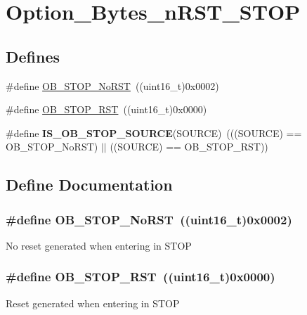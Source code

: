 \hypertarget{group__Option__Bytes__nRST__STOP}{
\section{Option\_\-Bytes\_\-nRST\_\-STOP}
\label{group__Option__Bytes__nRST__STOP}
}
\subsection*{Defines}
\begin{DoxyCompactItemize}
\item 
\#define \hyperlink{group__Option__Bytes__nRST__STOP_ga6762d6e4045fec58b49dfc03c1927d51}{OB\_\-STOP\_\-NoRST}~((uint16\_\-t)0x0002)
\item 
\#define \hyperlink{group__Option__Bytes__nRST__STOP_gaef92c03b1f279c532bfa13d3bb074b57}{OB\_\-STOP\_\-RST}~((uint16\_\-t)0x0000)
\item 
\hypertarget{group__Option__Bytes__nRST__STOP_ga131ae3434f300c8317dd6b3b349c7cab}{
\#define {\bfseries IS\_\-OB\_\-STOP\_\-SOURCE}(SOURCE)~(((SOURCE) == OB\_\-STOP\_\-NoRST) $|$$|$ ((SOURCE) == OB\_\-STOP\_\-RST))}
\label{group__Option__Bytes__nRST__STOP_ga131ae3434f300c8317dd6b3b349c7cab}

\end{DoxyCompactItemize}


\subsection{Define Documentation}
\hypertarget{group__Option__Bytes__nRST__STOP_ga6762d6e4045fec58b49dfc03c1927d51}{
\subsubsection[{OB\_\-STOP\_\-NoRST}]{\setlength{\rightskip}{0pt plus 5cm}\#define OB\_\-STOP\_\-NoRST~((uint16\_\-t)0x0002)}}
\label{group__Option__Bytes__nRST__STOP_ga6762d6e4045fec58b49dfc03c1927d51}
No reset generated when entering in STOP \hypertarget{group__Option__Bytes__nRST__STOP_gaef92c03b1f279c532bfa13d3bb074b57}{
\subsubsection[{OB\_\-STOP\_\-RST}]{\setlength{\rightskip}{0pt plus 5cm}\#define OB\_\-STOP\_\-RST~((uint16\_\-t)0x0000)}}
\label{group__Option__Bytes__nRST__STOP_gaef92c03b1f279c532bfa13d3bb074b57}
Reset generated when entering in STOP 